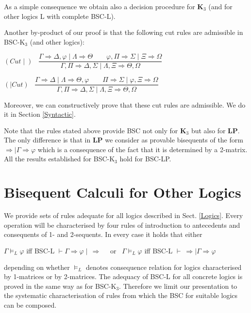 \documentclass[10pt,a4paper]{article}
\theoremstyle{definition}
\newcommand{\3}{\vspace{.3in}}
\newcommand{\2}{\vspace{.2in}}
\newcommand{\1}{\vspace{.1in}}
\newcommand{\5}{\vspace{.05in}}
\begin{document}
As a simple consequence we obtain also a decision procedure for {\bf K$_3$} (and for other logics L with complete BSC-L).

Another by-product of our proof is that the following cut rules are admissible in BSC-K$_3$ (and other logics):


\begin{flushleft}\label{Cut}
	$(Cut\mid)$ \ $\dfrac{\Gamma 
	\Rightarrow  \Delta, \varphi \mid \Lambda\Rightarrow\Theta \qquad
	\varphi, \Pi  \Rightarrow  \Sigma \mid \Xi\Rightarrow\Omega} {\Gamma, \Pi  \Rightarrow  \Delta, \Sigma \mid \Lambda, \Xi\Rightarrow\Theta, \Omega}$
\end{flushleft}

\begin{flushleft}
	$(\mid Cut)$ \ $\dfrac{\Gamma 
	\Rightarrow  \Delta \mid \Lambda\Rightarrow\Theta, \varphi \qquad
	\Pi  \Rightarrow  \Sigma \mid \varphi, \Xi\Rightarrow\Omega} {\Gamma, \Pi  \Rightarrow  \Delta, \Sigma \mid \Lambda, \Xi\Rightarrow\Theta, \Omega}$
\end{flushleft}

Moreover, we can constructively prove that these cut rules are admissible. We do it in Section \ref{Syntactic}. 


Note that the rules stated above provide BSC not only for {\bf K$_3$} but also for {\bf LP}. The only difference is that in {\bf LP} we consider as provable bisequents of the form $\Rightarrow \mid \Gamma\Rightarrow\varphi$ which is a consequence of the fact that it is determined by a 2-matrix.
All the results established for BSC-K$_3$ hold for BSC-LP. 


\section{Bisequent Calculi for Other Logics}\label{OtherLogics}

We provide sets of rules adequate for all logics described in Sect. \ref{Logics}. Every operation
will be characterised by four rules of introduction to antecedents and consequents
of 1- and 2-sequents. In every case it holds that either

\1

$\Gamma\models_L \varphi$ iff BSC-L $\vdash \Gamma\Rightarrow\varphi \mid\,\Rightarrow$ \ \ or \ $\Gamma\models_L \varphi$ iff BSC-L $\vdash \ \Rightarrow \mid \Gamma\Rightarrow\varphi$

\1

depending on whether $\models_L$ denotes consequence relation for logics characterised by 1-matrices or by 2-matrices. The adequacy of BSC-L for all concrete logics is proved in the same way as for BSC-K$_3$. Therefore we limit our presentation to the systematic characterisation of rules from which the BSC for suitable logics can be composed.
\end{document}
